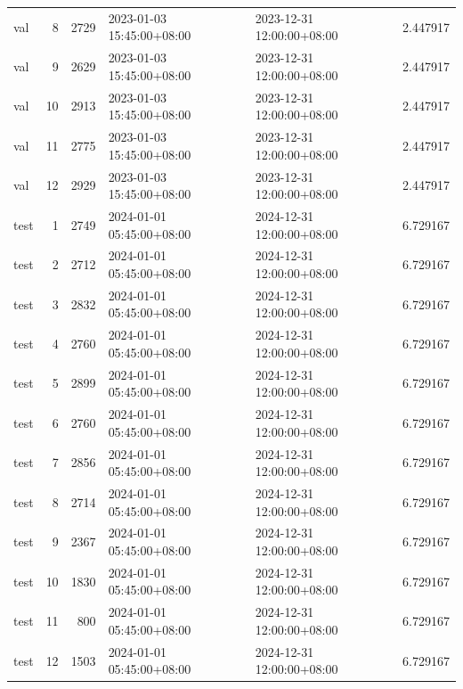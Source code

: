 \begin{tabular}{lrrllr}
val & 8 & 2729 & 2023-01-03 15:45:00+08:00 & 2023-12-31 12:00:00+08:00 & 2.447917 \\
val & 9 & 2629 & 2023-01-03 15:45:00+08:00 & 2023-12-31 12:00:00+08:00 & 2.447917 \\
val & 10 & 2913 & 2023-01-03 15:45:00+08:00 & 2023-12-31 12:00:00+08:00 & 2.447917 \\
val & 11 & 2775 & 2023-01-03 15:45:00+08:00 & 2023-12-31 12:00:00+08:00 & 2.447917 \\
val & 12 & 2929 & 2023-01-03 15:45:00+08:00 & 2023-12-31 12:00:00+08:00 & 2.447917 \\
test & 1 & 2749 & 2024-01-01 05:45:00+08:00 & 2024-12-31 12:00:00+08:00 & 6.729167 \\
test & 2 & 2712 & 2024-01-01 05:45:00+08:00 & 2024-12-31 12:00:00+08:00 & 6.729167 \\
test & 3 & 2832 & 2024-01-01 05:45:00+08:00 & 2024-12-31 12:00:00+08:00 & 6.729167 \\
test & 4 & 2760 & 2024-01-01 05:45:00+08:00 & 2024-12-31 12:00:00+08:00 & 6.729167 \\
test & 5 & 2899 & 2024-01-01 05:45:00+08:00 & 2024-12-31 12:00:00+08:00 & 6.729167 \\
test & 6 & 2760 & 2024-01-01 05:45:00+08:00 & 2024-12-31 12:00:00+08:00 & 6.729167 \\
test & 7 & 2856 & 2024-01-01 05:45:00+08:00 & 2024-12-31 12:00:00+08:00 & 6.729167 \\
test & 8 & 2714 & 2024-01-01 05:45:00+08:00 & 2024-12-31 12:00:00+08:00 & 6.729167 \\
test & 9 & 2367 & 2024-01-01 05:45:00+08:00 & 2024-12-31 12:00:00+08:00 & 6.729167 \\
test & 10 & 1830 & 2024-01-01 05:45:00+08:00 & 2024-12-31 12:00:00+08:00 & 6.729167 \\
test & 11 & 800 & 2024-01-01 05:45:00+08:00 & 2024-12-31 12:00:00+08:00 & 6.729167 \\
test & 12 & 1503 & 2024-01-01 05:45:00+08:00 & 2024-12-31 12:00:00+08:00 & 6.729167 \\
\bottomrule
\end{tabular}
